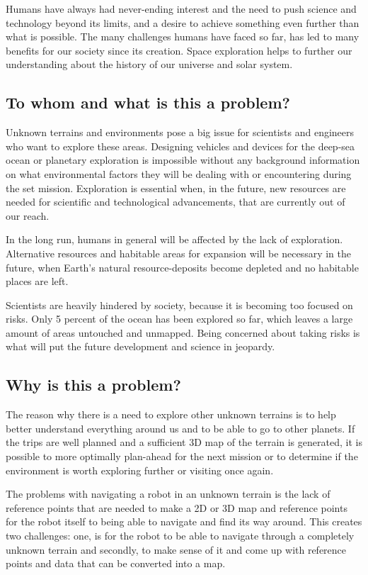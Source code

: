 Humans have always had never-ending interest and the need to push science and technology beyond its limits, and a desire to achieve something even further than what is possible. The many challenges humans have faced so far, has led to many benefits for our society since its creation. Space exploration helps to further our understanding about the history of our universe and solar system\cite{whyweexplo}.

\subsection{To whom and what is this a problem?}
Unknown terrains and environments pose a big issue for scientists and engineers who want to explore these areas. Designing vehicles and devices for the deep-sea ocean or planetary exploration is impossible without any background information on what environmental factors they will be dealing with or encountering during the set mission. Exploration is essential when, in the future, new resources are needed for scientific and technological advancements, that are currently out of our reach.

In the long run, humans in general will be affected by the lack of exploration. Alternative resources and habitable areas for expansion will be necessary in the future, when Earth's natural resource-deposits become depleted and no habitable places are left. 

Scientists are heavily hindered by society, because it is becoming too focused on risks. Only 5 percent of the ocean has been explored so far, which leaves a large amount of areas untouched and unmapped. Being concerned about taking risks is what will put the future development and science in jeopardy\cite{risksandexplo}. 

\subsection{Why is this a problem?}
The reason why there is a need to explore other unknown terrains is to help better understand everything around us and to be able to go to other planets. 
If the trips are well planned and a sufficient 3D map of the terrain is generated, it is possible to more optimally plan-ahead for the next mission or to determine if the environment is worth exploring further or visiting once again. 

The problems with navigating a robot in an unknown terrain is the lack of reference points that are needed to make a 2D or 3D map and reference points for the robot itself to being able to navigate and find its way around. This creates two challenges: one, is for the robot to be able to navigate through a completely unknown terrain and secondly, to make sense of it and come up with reference points and data that can be converted into a map.

